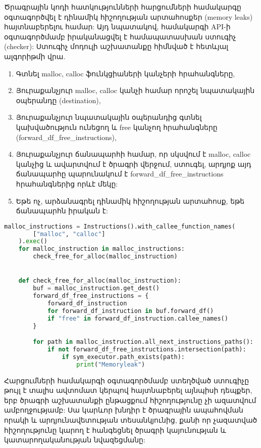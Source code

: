 Ծրագրային կոդի հատկությունների հարցումների համակարգը օգտագործվել է դինամիկ հիշողության
արտահոսքեր (memory leaks)\cite{MEMORYLEAK} հայտնաբերելու համար: Այդ նպատակով, համակարգի API-ի օգտագործմամբ
իրականացվել է համապատասխան ստուգիչ (checker): Ստուգիչ մոդուլի աշխատանքը հիմնված է հետևյալ ալգորիթմի վրա.
\begin{enumerate}
    \item Գտնել malloc, calloc ֆունկցիաների կանչերի հրահանգները,
    \item Յուրաքանչյուր malloc, calloc կանչի համար որոշել նպատակային օպերանդը (destination),
    \item Յուրաքանչյուր նպատակային օպերանդից գտնել կախվածություն ունեցող և free կանչող հրահանգները (forward\_df\_free\_instructions),
    \item Յուրաքանչյուր ճանապարհի համար, որ սկսվում է malloc, calloc կանչից և ավարտվում է ծրագրի վերջում, ստուգել, արդյոք այդ ճանապարհը պարունակում է forward\_df\_free\_instructions հրահանգներից որևէ մեկը:
    \item Եթե ոչ, արձանագրել դինամիկ հիշողության արտահոսք, եթե ճանապարհն իրական է:
\end{enumerate}
\begin{lstlisting}[language=Python]
    malloc_instructions = Instructions().with_callee_function_names(
        ["malloc", "calloc"]
    ).exec()
    for malloc_instruction in malloc_instructions:
        check_free_for_alloc(malloc_instruction)


    def check_free_for_alloc(malloc_instruction):
        buf = malloc_instruction.get_dest()
        forward_df_free_instructions = {
            forward_df_instruction
            for forward_df_instruction in buf.forward_df()
            if "free" in forward_df_instruction.callee_names()
        }

        for path in malloc_instruction.all_next_instructions_paths():
            if not forward_df_free_instructions.intersection(path):
                if sym_executor.path_exists(path):
                    print("Memoryleak")
\end{lstlisting}
Հարցումների համակարգի օգտագործմամբ ստեղծված ստուգիչը թույլ է տալիս ավտոմատ կերպով հայտնաբերել
այնպիսի դեպքեր, երբ ծրագրի աշխատանքի ընթացքում հիշողությունը չի ազատվում ամբողջությամբ: Սա կարևոր խնդիր է ծրագրային
ապահովման որակի և արդյունավետության տեսանկյունից, քանի որ չազատված հիշողությունը կարող է հանգեցնել ծրագրի
կայունության և կատարողականության նվազեցմանը:


